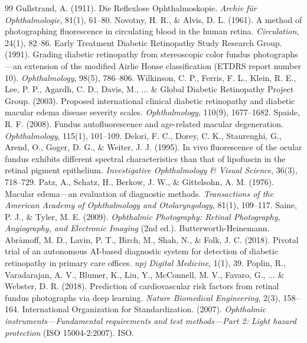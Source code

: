 \documentclass[11pt,a4paper]{article}
\begin{document}
\begin{thebibliography}{99}
 Gullstrand, A. (1911). Die Reflexlose Ophthalmoskopie. \textit{Archiv für Ophthalmologie}, 81(1), 61--80.
 Novotny, H. R., \& Alvis, D. L. (1961). A method of photographing fluorescence in circulating blood in the human retina. \textit{Circulation}, 24(1), 82--86.
 Early Treatment Diabetic Retinopathy Study Research Group. (1991). Grading diabetic retinopathy from stereoscopic color fundus photographs—an extension of the modified Airlie House classification (ETDRS report number 10). \textit{Ophthalmology}, 98(5), 786--806.
 Wilkinson, C. P., Ferris, F. L., Klein, R. E., Lee, P. P., Agardh, C. D., Davis, M., ... \& Global Diabetic Retinopathy Project Group. (2003). Proposed international clinical diabetic retinopathy and diabetic macular edema disease severity scales. \textit{Ophthalmology}, 110(9), 1677--1682.
 Spaide, R. F. (2008). Fundus autofluorescence and age-related macular degeneration. \textit{Ophthalmology}, 115(1), 101--109.
 Delori, F. C., Dorey, C. K., Staurenghi, G., Arend, O., Goger, D. G., \& Weiter, J. J. (1995). In vivo fluorescence of the ocular fundus exhibits different spectral characteristics than that of lipofuscin in the retinal pigment epithelium. \textit{Investigative Ophthalmology \& Visual Science}, 36(3), 718--729.
 Patz, A., Schatz, H., Berkow, J. W., \& Gittelsohn, A. M. (1976). Macular edema—an evaluation of diagnostic methods. \textit{Transactions of the American Academy of Ophthalmology and Otolaryngology}, 81(1), 109--117.
 Saine, P. J., \& Tyler, M. E. (2009). \textit{Ophthalmic Photography: Retinal Photography, Angiography, and Electronic Imaging} (2nd ed.). Butterworth-Heinemann.
 Abràmoff, M. D., Lavin, P. T., Birch, M., Shah, N., \& Folk, J. C. (2018). Pivotal trial of an autonomous AI-based diagnostic system for detection of diabetic retinopathy in primary care offices. \textit{npj Digital Medicine}, 1(1), 39.
 Poplin, R., Varadarajan, A. V., Blumer, K., Liu, Y., McConnell, M. V., Favaro, G., ... \& Webster, D. R. (2018). Prediction of cardiovascular risk factors from retinal fundus photographs via deep learning. \textit{Nature Biomedical Engineering}, 2(3), 158--164.
 International Organization for Standardization. (2007). \textit{Ophthalmic instruments—Fundamental requirements and test methods—Part 2: Light hazard protection} (ISO 15004-2:2007). ISO.
\end{thebibliography}
\end{document}
